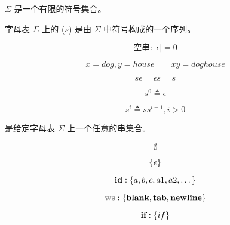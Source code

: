 \begin{frame}{}
  \begin{definition}[字母表]
     $\Sigma$ 是一个有限的符号集合。
  \end{definition}
  
\end{frame}

\begin{frame}{}
  \begin{definition}[串]
    字母表 $\Sigma$ 上的 ($s$) 是由 $\Sigma$ 中符号构成的一个序列。
  \end{definition}

  \vspace{-0.30cm}
  \[
    \text{空串}: |\epsilon| = 0
  \]
\end{frame}

\begin{frame}{}
  \begin{definition}[串上的``连接''运算]
    \[
      x = dog, y = house \qquad xy = doghouse
    \]

    \[
      s \epsilon = \epsilon s = s
    \]
  \end{definition}

  \pause
  \vspace{0.60cm}
  \begin{definition}[串上的``指数''运算]
    \[
      s^{0} \triangleq \epsilon
    \]

    \[
      s^{i} \triangleq s s^{i-1}, i > 0
    \]
  \end{definition}
\end{frame}

\begin{frame}{}
  \begin{definition}[语言]
    是给定字母表 $\Sigma$ 上一个任意的串集合。
  \end{definition}

  \[
    \emptyset 
  \]

  \[
    \{\epsilon\}
  \]

  \pause
  \[
    \text{\bf id}: \{a, b, c, a1, a2, \dots\}
  \]

  \[
    \ws: \set{\blank, \tab, \line}
  \]

  \[
    \text{\bf if}: \{if\}
  \]
\end{frame}

